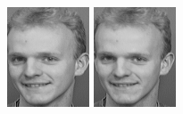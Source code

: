 \begin{figure}[ht]
 \includegraphics[width=\columnwidth/11]{ch3/figures/s5_5.png}
 \includegraphics[width=\columnwidth/11]{ch3/figures/s5_6.png}

\end{figure}
